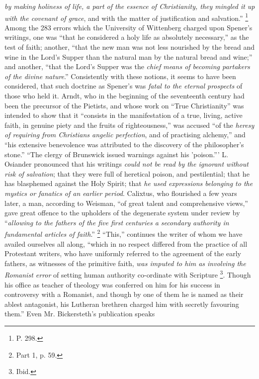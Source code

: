 \emph{by making holiness of life, a part of the essence of Christianity,
they mingled it up with the covenant of grace}, and with the matter
of justification and salvation.'' \footnote{P. 298.}
Among the 283 errors which the University of Wittenberg charged upon
Spener's writings, one was ``that he considered a holy life as absolutely
necessary,'' as the test of faith; another, ``that the new man was not
less nourished by the bread and wine in the Lord's Supper than the
natural man by the natural bread and wine;'' and another, ``that the Lord's
Supper was the \emph{chief means of becoming partakers of the divine nature}.''
Consistently with these notions, it seems to have been considered, that
such doctrine as Spener's was \emph{fatal to the eternal prospects} of
those who held it. Arndt, who in the beginning of the seventeenth
century had been the precursor of the Pietists, and whose work on ``True
Christianity'' was intended to show that it ``consists in the
manifestation of a true, living, active faith, in genuine piety and the
fruits of righteousness,'' was accused ``of the \emph{heresy of requiring
from Christians angelic perfection}, and of practising alchemy,'' and ``his
extensive benevolence was attributed to the discovery of the philosopher's
stone.'' ``The clergy of Brunswick issued warnings against his 'poison.'''
L. Osiander pronounced that his writings \emph{could not be read by the
ignorant without risk of salvation}; that they were full of heretical
poison, and pestilential; that he has blasphemed against the Holy
Spirit; that \emph{he used expressions belonging to the mystics or fanatics
of an earlier period}. Calixtus, who flourished a few years later, a
man, according to Weisman, ``of great talent and comprehensive views,''
gave great offence to the upholders of the degenerate system under
review by ``\emph{allowing to the fathers of the five first centuries a
secondary authority in fundamental articles of faith}.'' \footnote{Part 1, p. 59.} ``This,'' continues the writer of whom we have availed ourselves
all along, ``which in no respect differed from the practice of all
Protestant writers, who have uniformly referred to the agreement of the
early fathers, as witnesses of the primitive faith, \emph{was imputed to
him as involving the Romanist error} of setting human authority
co-ordinate with Scripture \footnote{Ibid.}.
Though his office as teacher of theology was conferred on him for his
success in controversy with a Romanist, and though by one of them he is
named as their ablest antagonist, his Lutheran brethren charged him with
secretly favouring them.'' Even Mr. Bickersteth's publication speaks
